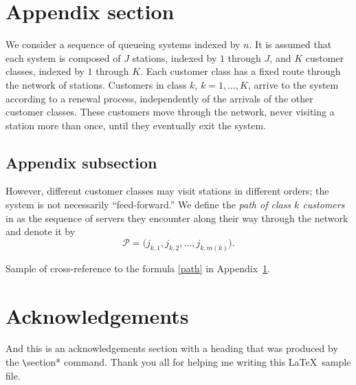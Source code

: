 \documentclass[pamq,keywordsasfootnote]{ipart}
\begin{document}
\appendix

\section{Appendix section}\label{app}

We consider a sequence of queueing systems
indexed by $n$.  It is assumed that each system
is composed of $J$ stations, indexed by $1$
through $J$, and $K$ customer classes, indexed
by $1$ through $K$.  Each customer class
has a fixed route through the network of
stations.  Customers in class
$k$, $k=1,\ldots,K$, arrive to the
system according to a
renewal process, independently of the arrivals
of the other customer classes.  These customers
move through the network, never visiting a station
more than once, until they eventually exit
the system.

\subsection{Appendix subsection}

However, different customer classes may visit
stations in different orders; the system
is not necessarily ``feed-forward.''
We define the {\em path of class $k$ customers} in
as the sequence of servers
they encounter along their way through the network
and denote it by
\begin{equation}
\mathcal{P}=\bigl(j_{k,1},j_{k,2},\dots,j_{k,m(k)}\bigr). \label{path}
\end{equation}

Sample of cross-reference to the formula \ref{path} in Appendix~\ref{app}.

\section*{Acknowledgements}
And this is an acknowledgements section with a heading that was produced by the
\verb|\|section* command. Thank you all for helping me writing this
\LaTeX\ sample file.
\end{document}
